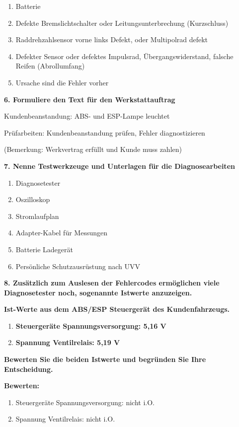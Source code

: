 \begin{enumerate}
\item
  Batterie
\item
  Defekte Bremslichtschalter oder Leitungsunterbrechung (Kurzschluss)
\item
  Raddrehzahlsensor vorne links Defekt, oder Multipolrad defekt
\item
  Defekter Sensor oder defektes Impulsrad, Übergangswiderstand, falsche
  Reifen (Abrollumfang)
\item
  Ursache sind die Fehler vorher
\end{enumerate}

\textbf{6. Formuliere den Text für den Werkstattauftrag}

Kundenbeanstandung: ABS- und ESP-Lampe leuchtet

Prüfarbeiten: Kundenbeanstandung prüfen, Fehler diagnostizieren

(Bemerkung: Werkvertrag erfüllt und Kunde muss zahlen)

\newpage

\textbf{7. Nenne Testwerkzeuge und Unterlagen für die Diagnosearbeiten}

\begin{enumerate}
\item
  Diagnosetester
\item
  Oszilloskop
\item
  Stromlaufplan
\item
  Adapter-Kabel für Messungen
\item
  Batterie Ladegerät
\item
  Persönliche Schutzausrüstung nach UVV
\end{enumerate}

\textbf{8. Zusätzlich zum Auslesen der Fehlercodes ermöglichen viele
Diagnosetester noch, sogenannte Istwerte anzuzeigen.}

\textbf{Ist-Werte aus dem ABS/ESP Steuergerät des Kundenfahrzeugs.}

\begin{enumerate}
\item
  \textbf{Steuergeräte Spannungsversorgung: 5,16 V}
\item
  \textbf{Spannung Ventilrelais: 5,19 V}
\end{enumerate}

\textbf{Bewerten Sie die beiden Istwerte und begründen Sie Ihre
Entscheidung.}

\textbf{Bewerten:}

\begin{enumerate}
\item
  Steuergeräte Spannungsversorgung: nicht i.O.
\item
  Spannung Ventilrelais: nicht i.O.
\end{enumerate}

